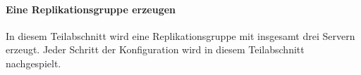 \paragraph{Eine Replikationsgruppe erzeugen}
In diesem Teilabschnitt wird eine Replikationsgruppe mit insgesamt drei Servern erzeugt. Jeder Schritt der Konfiguration wird in diesem Teilabschnitt nachgespielt.
%
%
%
%
%
%
%
%
%
%
%
